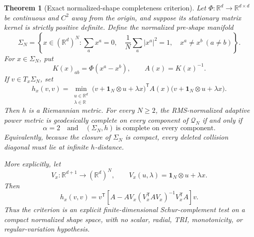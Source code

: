 \documentclass[11pt]{article}
\newtheorem{theorem}{Theorem}
\newcommand{\R}{\mathbb{R}}
\newcommand{\Q}{\mathcal{Q}}
\newcommand{\one}{\mathbf{1}}
\newcommand{\kron}{\mathbin{\otimes}}
\begin{document}
\begin{theorem}[Exact normalized-shape completeness criterion]
\label{thm:shapequotient}
Let \(\Phi:\R^d\to\R^{d\times d}\) be continuous and \(C^2\) away from the
origin, and suppose its stationary matrix kernel is strictly positive
definite.  Define the normalized pre-shape manifold
\[
 \Sigma_N=\left\{
 x\in(\R^d)^N:
 \sum_a x^a=0,\quad
 \frac1N\sum_a|x^a|^2=1,\quad
 x^a\ne x^b\ (a\ne b)
 \right\}.
\]
For \(x\in\Sigma_N\), put
\[
 K(x)_{ab}=\Phi(x^a-x^b),\qquad A(x)=K(x)^{-1}.
\]
If \(v\in T_x\Sigma_N\), set
\begin{equation}
 h_x(v,v)=
 \min_{\substack{u\in\R^d\\ \lambda\in\R}}
 \bigl(v+\one_N\kron u+\lambda x\bigr)^{\mathsf T}
 A(x)
 \bigl(v+\one_N\kron u+\lambda x\bigr).
 \label{eq:shapequotient}
\end{equation}
Then \(h\) is a Riemannian metric.  For every \(N\ge2\), the
RMS-normalized adaptive power metric is geodesically complete on every
component of \(\Q_N\) if and only if
\[
 \boxed{\qquad
 \alpha=2
 \quad\text{and}\quad
 (\Sigma_N,h)\ \text{is complete on every component}.
 \qquad}
\]
Equivalently, because the closure of \(\Sigma_N\) is compact, every deleted
collision diagonal must lie at infinite \(h\)-distance.

More explicitly, let
\[
 V_x:\R^{d+1}\longrightarrow(\R^d)^N,\qquad
 V_x(u,\lambda)=\one_N\kron u+\lambda x.
\]
Then
\begin{equation}
 h_x(v,v)=v^{\mathsf T}
 \left[
 A-AV_x(V_x^{\mathsf T}AV_x)^{-1}V_x^{\mathsf T}A
 \right]v.
 \label{eq:shapeSchur}
\end{equation}
Thus the criterion is an explicit finite-dimensional Schur-complement test
on a compact normalized shape space, with no scalar, radial, TRI,
monotonicity, or regular-variation hypothesis.
\end{theorem}
\end{document}
